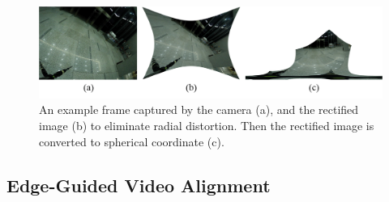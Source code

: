 \documentclass[conference]{IEEEtran}
\begin{document}
\begin{figure}[t]
\centering
\includegraphics[scale=0.25]{picture57.png}
\caption{An example frame captured by the camera (a), and the rectified image (b) to eliminate radial distortion. Then the rectified image is converted to spherical coordinate (c).}
\label{fig:ori_cal_pro}
\end{figure}




\subsection{Edge-Guided Video Alignment}
\label{ssec:edge-detection}
\end{document}
